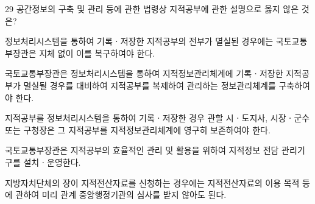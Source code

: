 \begin{question}{29}
공간정보의 구축 및 관리 등에 관한 법령상 지적공부에 관한 설명으로 옳지 않은 것은?
\begin{choices}
  \item 정보처리시스템을 통하여 기록ㆍ저장한 지적공부의 전부가 멸실된 경우에는 국토교통부장관은 지체 없이 이를 복구하여야 한다.
  \item 국토교통부장관은 정보처리시스템을 통하여 지적정보관리체계에 기록ㆍ저장한 지적공부가 멸실될 경우를 대비하여 지적공부를 복제하여 관리하는 정보관리체계를 구축하여야 한다.
  \item 지적공부를 정보처리시스템을 통하여 기록ㆍ저장한 경우 관할 시ㆍ도지사, 시장ㆍ군수 또는 구청장은 그 지적공부를 지적정보관리체계에 영구히 보존하여야 한다.
  \item 국토교통부장관은 지적공부의 효율적인 관리 및 활용을 위하여 지적정보 전담 관리기구를 설치ㆍ운영한다.
  \item 지방자치단체의 장이 지적전산자료를 신청하는 경우에는 지적전산자료의 이용 목적 등에 관하여 미리 관계 중앙행정기관의 심사를 받지 않아도 된다.
\end{choices}
\end{question}

